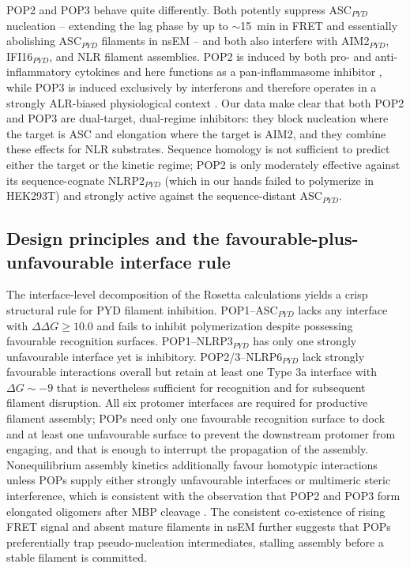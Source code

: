 \documentclass[11pt]{article}
\begin{document}
POP2 and POP3 behave quite differently. Both potently suppress
ASC$_{PYD}$ nucleation -- extending the lag phase by up to $\sim$15~min
in FRET and essentially abolishing ASC$_{PYD}$ filaments in nsEM -- and
both also interfere with AIM2$_{PYD}$, IFI16$_{PYD}$, and NLR filament
assemblies. POP2 is induced by both pro- and anti-inflammatory cytokines
and here functions as a pan-inflammasome inhibitor
\citep{periasamy2017pop2, ratsimandresy2017pop2}, while POP3 is induced
exclusively by interferons and therefore operates in a strongly
ALR-biased physiological context \citep{khare2014pop3}. Our data make
clear that both POP2 and POP3 are dual-target, dual-regime inhibitors:
they block nucleation where the target is ASC and elongation where the
target is AIM2, and they combine these effects for NLR substrates.
Sequence homology is not sufficient to predict either the target or the
kinetic regime; POP2 is only moderately effective against its
sequence-cognate NLRP2$_{PYD}$ (which in our hands failed to polymerize
in HEK293T) and strongly active against the sequence-distant
ASC$_{PYD}$.

\subsection{Design principles and the favourable-plus-unfavourable
interface rule}

The interface-level decomposition of the Rosetta calculations yields a
crisp structural rule for PYD filament inhibition. POP1--ASC$_{PYD}$
lacks any interface with $\Delta\Delta G \geq 10.0$ and fails to inhibit
polymerization despite possessing favourable recognition surfaces.
POP1--NLRP3$_{PYD}$ has only one strongly unfavourable interface yet is
inhibitory. POP2/3--NLRP6$_{PYD}$ lack strongly favourable interactions
overall but retain at least one Type 3a interface with $\Delta G \sim -9$
that is nevertheless sufficient for recognition and for subsequent
filament disruption. All six protomer interfaces are required for
productive filament assembly; POPs need only one favourable recognition
surface to dock and at least one unfavourable surface to prevent the
downstream protomer from engaging, and that is enough to interrupt the
propagation of the assembly. Nonequilibrium assembly kinetics
additionally favour homotypic interactions unless POPs supply either
strongly unfavourable interfaces or multimeric steric interference, which
is consistent with the observation that POP2 and POP3 form elongated
oligomers after MBP cleavage \citep{mazanek2019fret}. The consistent
co-existence of rising FRET signal and absent mature filaments in nsEM
further suggests that POPs preferentially trap pseudo-nucleation
intermediates, stalling assembly before a stable filament is committed.
\end{document}
